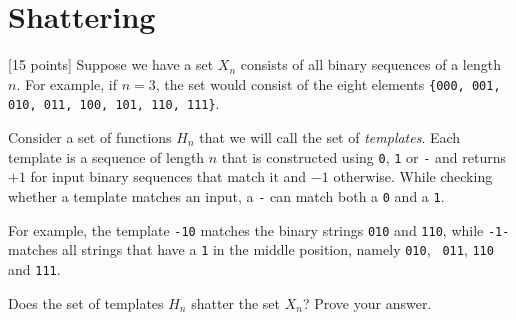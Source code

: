 \section{Shattering}
\label{sec:shattering}

[15 points] Suppose we have a set $X_n$ consists of all binary
sequences of a length $n$.  For example, if $n=3$, the set would
consist of the eight elements \texttt{\{000, 001, 010, 011, 100,
  101, 110, 111\}}.

Consider a set of functions $H_n$ that we will call the set of
{\em templates}. Each template is a sequence of length $n$ that is
constructed using {\tt 0}, {\tt 1} or {\tt -} and returns $+1$ for
input binary sequences that match it and $-1$ otherwise. While
checking whether a template matches an input, a {\tt -} can match
both a {\tt 0} and a {\tt 1}.

For example, the template {\tt -10} matches the binary strings
{\tt 010} and {\tt 110}, while {\tt -1-} matches all strings that
have a {\tt 1} in the middle position, namely {\tt 010}, {\tt
  011}, {\tt 110} and {\tt 111}.

Does the set of templates $H_n$ shatter the set $X_n$? Prove your
answer.

